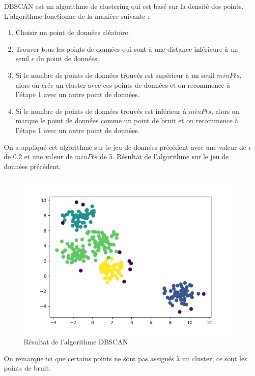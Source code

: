 \documentclass[french,a4paper,18pt]{article}
\begin{document}
DBSCAN est un algorithme de clustering qui est basé sur la densité des points. 
L'algorithme fonctionne de la manière suivante :
\begin{enumerate}
    \item Choisir un point de données aléatoire.
    \item Trouver tous les points de données qui sont à une distance inférieure à un seuil $\epsilon$ du point de données.
    \item Si le nombre de points de données trouvés est supérieur à un seuil $minPts$, alors on crée un cluster avec ces points de données et on recommence à l'étape 1 avec un autre point de données.
    \item Si le nombre de points de données trouvés est inférieur à $minPts$, alors on marque le point de données comme un point de bruit et on recommence à l'étape 1 avec un autre point de données.
\end{enumerate}

On a appliqué cet algorithme sur le jeu de données précédent avec une valeur de $\epsilon$ de 0.2 et une valeur de $minPts$ de 5.
Résultat de l'algorithme sur le jeu de données précédent.
\begin{figure}[h!]
    \centering
    \includegraphics[scale=0.5]{../images/short_simulation_dbscan.png}
    \caption{Résultat de l'algorithme DBSCAN}\label{fig:short_simulation_dbscan}
\end{figure}

On remarque ici que certains points ne sont pas assignés à un cluster, ce sont les points de bruit.

\pagebreak
\end{document}
